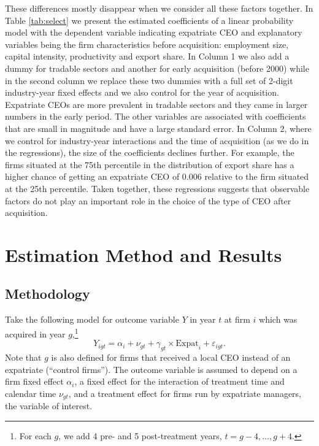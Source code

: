 \documentclass[12pt,a4paper]{article}
\begin{document}
These differences mostly disappear when we consider all these factors together. In Table \ref{tab:select} we present the estimated coefficients of a linear probability model with the dependent variable indicating expatriate CEO and explanatory variables being the firm characteristics before acquisition: employment size, capital intensity, productivity and export share. In Column 1 we also add a dummy for tradable sectors and another for early acquisition (before 2000) while in the second column we replace these two dummies with a full set of 2-digit industry-year fixed effects and we also control for the year of acquisition. Expatriate CEOs are more prevalent in tradable sectors and they came in larger numbers in the early period. The other variables are associated with coefficients that are small in magnitude and have a large standard error. In Column 2, where we control for industry-year interactions and the time of acquisition (as we do in the regressions), the size of the coefficients declines further. For example, the firms situated at the 75th percentile in the distribution of export share has a higher chance of getting an expatriate CEO of 0.006 relative to the firm situated at the 25th percentile. Taken together, these regressions suggests that observable factors do not play an important role in the choice of the type of CEO after acquisition.


\section{Estimation Method and Results}\label{sec: meth}

\subsection{Methodology}

Take the following model for outcome variable $Y$ in year $t$ at firm $i$ which was acquired in year $g$,\footnote{For each $g$, we add 4 pre- and 5 post-treatment years, $t=g-4,...,g+4$.}
\begin{equation}\label{eq:reg}
    Y_{igt} = \alpha_i + \nu_{gt} + \gamma_{gt}\times \text{Expat}_i + \varepsilon_{igt}.
\end{equation}
Note that $g$ is also defined for firms that received a local CEO instead of an expatriate (``control firms''). The outcome variable is assumed to depend on a firm fixed effect $\alpha_i$, a fixed effect for the interaction of treatment time and calendar time $\nu_{gt}$, and a treatment effect for firms run by expatriate managers, the variable of interest.
\end{document}
